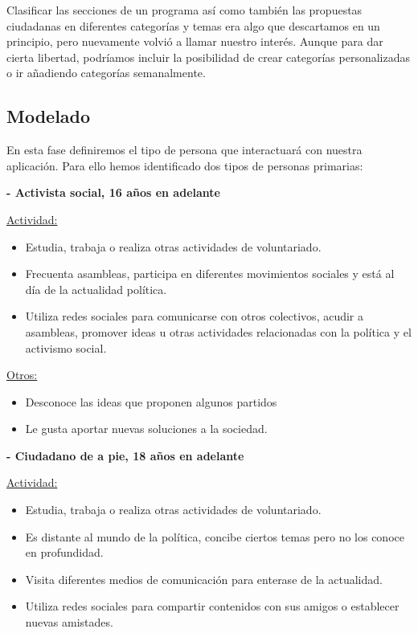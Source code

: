 Clasificar las secciones de un programa así como también las propuestas ciudadanas en diferentes categorías y temas era algo que descartamos en un principio, pero nuevamente volvió a llamar nuestro interés. Aunque para dar cierta libertad, podríamos incluir la posibilidad de crear categorías personalizadas o ir añadiendo categorías semanalmente.

\subsection{Modelado}

En esta fase definiremos el tipo de persona que interactuará con nuestra aplicación. Para ello hemos identificado dos tipos de personas primarias:

\textbf{- Activista social, 16 años en adelante}

\underline{Actividad:}

\begin{itemize}
\item Estudia, trabaja o realiza otras actividades de voluntariado.
\item Frecuenta asambleas, participa en diferentes movimientos sociales y está al día de la actualidad política.
\item Utiliza redes sociales para comunicarse con otros colectivos, acudir a asambleas, promover ideas u otras actividades relacionadas con la política y el activismo social.
\end{itemize}

\underline{Otros:}

\begin{itemize}
\item Desconoce las ideas que proponen algunos partidos 
\item Le gusta aportar nuevas soluciones a la sociedad.
\end{itemize}

\textbf{- Ciudadano de a pie, 18 años en adelante}

\underline{Actividad:}

\begin{itemize}
\item Estudia, trabaja o realiza otras actividades de voluntariado.
\item Es distante al mundo de la política, concibe ciertos temas pero no los conoce en profundidad.
\item Visita diferentes medios de comunicación para enterase de la actualidad.
\item Utiliza redes sociales para compartir contenidos con sus amigos o establecer nuevas amistades.
\end{itemize}

